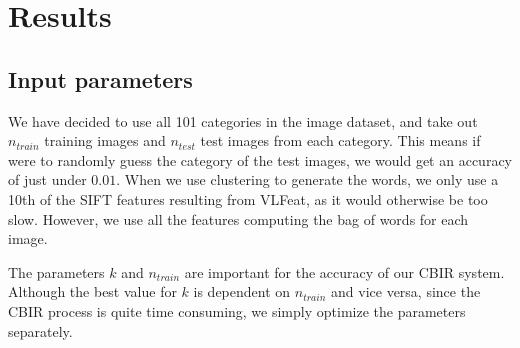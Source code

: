 \documentclass[11pt,a4paper]{article}
\begin{document}
\section{Results}

\subsection{Input parameters}

We have decided to use all 101 categories in the image dataset, and take out $n_{train}$ training images and $n_{test}$ test images from each category. This means if were to randomly guess the category of the test images, we would get an accuracy of just under $0.01$. When we use clustering to generate the words, we only use a 10th of the SIFT features resulting from VLFeat, as it would otherwise be too slow. However, we use all the features computing the bag of words for each image.

The parameters $k$ and $n_{train}$ are important for the accuracy of our CBIR system. Although the best value for $k$ is dependent on $n_{train}$ and vice versa, since the CBIR process is quite time consuming, we simply optimize the parameters separately.
\end{document}
